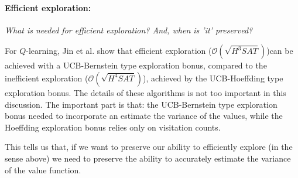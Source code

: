 
\paragraph{Efficient exploration:} \textsl{What is needed for efficient exploration? And, when is 'it' preserved?}

For $Q$-learning, Jin et al. \cite{Bubeck2018} show that efficient exploration ($\mathcal O(\sqrt{H^3SAT})$)\footnotemark can be
achieved with a UCB-Bernstein type exploration bonus, compared to the inefficient exploration ($\mathcal O(\sqrt{H^4SAT})$),
achieved by the UCB-Hoeffding type exploration bonus. The details of these algorithms is not too important in this discussion.
The important part is that: the UCB-Bernstein type exploration bonus needed to incorporate an
estimate the variance of the values, while the Hoeffding exploration bonus relies only on visitation counts.


This tells us that, if we want to preserve our ability to efficiently explore (in the sense above) we need to preserve the  ability to accurately estimate the variance of the value function.



%
%
%
%
%

